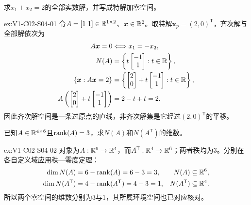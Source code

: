 \begin{SLChapterExercisePairSection}
\begin{exercise}[方程组全部解]\label{ex:V1-C02-S04-01}
求$x_1+x_2=2$的全部实数解，并写成特解加零空间。
\end{exercise}
\label{sol:V1-C02-S04-01}
\begin{chapterexercisesolution}{ex:V1-C02-S04-01}
令$A=[1\ 1]\in\R^{1\times2}$、$\boldsymbol{x}\in\mathbb{R}^2$。取特解$\boldsymbol{x}_p=(2,0)^{\mathsf T}$，齐次解与全部解依次为
\[
\begin{aligned}
A\boldsymbol{x}=0
&\Longleftrightarrow x_1=-x_2,\\
N(A)&=\left\{t\begin{bmatrix}-1\\1\end{bmatrix}:t\in\mathbb{R}\right\},\\
\{\boldsymbol{x}:A\boldsymbol{x}=2\}
&=\left\{\begin{bmatrix}2\\0\end{bmatrix}
+t\begin{bmatrix}-1\\1\end{bmatrix}:t\in\mathbb{R}\right\},\\
A\left(\begin{bmatrix}2\\0\end{bmatrix}
+t\begin{bmatrix}-1\\1\end{bmatrix}\right)&=2-t+t=2.
\end{aligned}
\]
因此齐次解空间是一条过原点的直线，非齐次解集是它经过$(2,0)^{\mathsf T}$的平移。
\end{chapterexercisesolution}

\begin{exercise}[秩与零度]\label{ex:V1-C02-S04-02}
已知$A\in\mathbb{R}^{4\times6}$且$\operatorname{rank}(A)=3$，求$N(A)$和$N(A^{\mathsf T})$的维数。
\end{exercise}
\label{sol:V1-C02-S04-02}
\begin{chapterexercisesolution}{ex:V1-C02-S04-02}
对象为$A:\mathbb{R}^6\to\mathbb{R}^4$，而$A^{\mathsf T}:\mathbb{R}^4\to\mathbb{R}^6$；两者秩均为$3$。分别在各自定义域应用秩—零度定理：
\[
\begin{aligned}
\dim N(A)&=6-\operatorname{rank}(A)=6-3=3,
&N(A)&\subseteq\mathbb{R}^6,\\
\dim N(A^{\mathsf T})
&=4-\operatorname{rank}(A^{\mathsf T})=4-3=1,
&N(A^{\mathsf T})&\subseteq\mathbb{R}^4.
\end{aligned}
\]
所以两个零空间的维数分别为$3$与$1$，其所属环境空间也已对应核对。
\end{chapterexercisesolution}


\end{SLChapterExercisePairSection}
